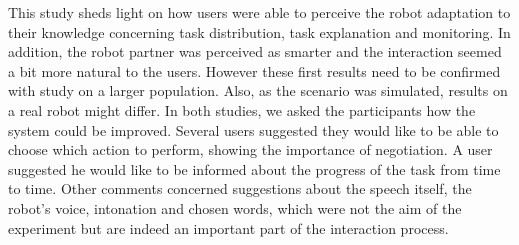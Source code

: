 This study sheds light on how users were able to perceive the robot adaptation to their knowledge concerning task distribution, task explanation and monitoring. In addition, the robot partner was perceived as smarter and the interaction seemed a bit more natural to the users. However these first results need to be confirmed with study on a larger population. Also, as the scenario was simulated, results on a real robot might differ.
In both studies, we asked the participants how the system could be improved. Several users suggested they would like to be able to choose which action to perform, showing the importance of negotiation. A user suggested he would like to be informed about the progress of the task from time to time. Other comments concerned suggestions about the speech itself, the robot's voice, intonation and chosen words, which were not the aim of the experiment but are indeed an important part of the interaction process. 

%


